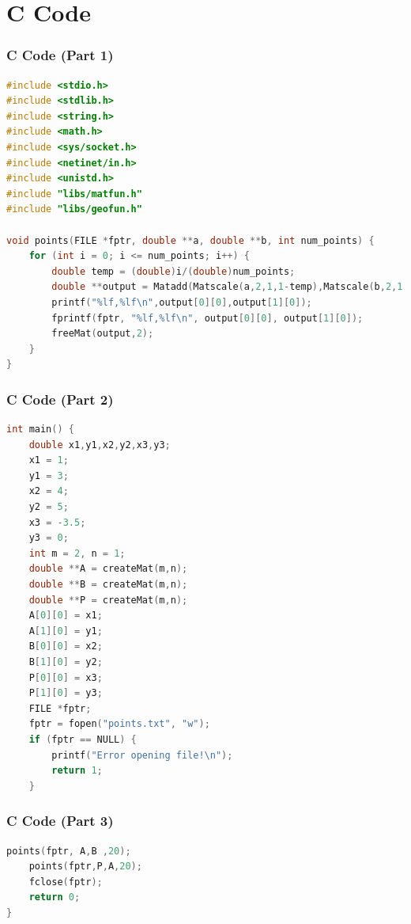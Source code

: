 \documentclass{beamer}
\theoremstyle{remark}
\begin{document}
\section{C Code}
\begin{frame}[fragile]
\frametitle{C Code (Part 1)}
\vspace{0.3cm} %
\begin{lstlisting}[language=C]
#include <stdio.h>
#include <stdlib.h>
#include <string.h>
#include <math.h>
#include <sys/socket.h>
#include <netinet/in.h>
#include <unistd.h>
#include "libs/matfun.h"
#include "libs/geofun.h"

void points(FILE *fptr, double **a, double **b, int num_points) {
    for (int i = 0; i <= num_points; i++) {
        double temp = (double)i/(double)num_points;
        double **output = Matadd(Matscale(a,2,1,1-temp),Matscale(b,2,1,temp),2,1);
        printf("%lf,%lf\n",output[0][0],output[1][0]);
        fprintf(fptr, "%lf,%lf\n", output[0][0], output[1][0]);
        freeMat(output,2);
    }
}
\end{lstlisting}
\vspace{0.3cm} %
\end{frame}

\begin{frame}[fragile]
\frametitle{C Code (Part 2)}
\vspace{0.3cm} %
\begin{lstlisting}[language=C]
int main() {
    double x1,y1,x2,y2,x3,y3;
    x1 = 1; 
    y1 = 3;
    x2 = 4; 
    y2 = 5;
    x3 = -3.5;
    y3 = 0;
    int m = 2, n = 1;
    double **A = createMat(m,n);
    double **B = createMat(m,n);
    double **P = createMat(m,n);
    A[0][0] = x1;
    A[1][0] = y1;
    B[0][0] = x2;
    B[1][0] = y2;
    P[0][0] = x3;
    P[1][0] = y3;
    FILE *fptr;
    fptr = fopen("points.txt", "w");
    if (fptr == NULL) {
        printf("Error opening file!\n");
        return 1;
    }
\end{lstlisting}
\vspace{0.3cm} %
\end{frame}

\begin{frame}[fragile]
\frametitle{C Code (Part 3)}
\vspace{0.3cm} %
\begin{lstlisting}[language=C]
    points(fptr, A,B ,20);
    points(fptr,P,A,20);
    fclose(fptr);
    return 0;
}
\end{lstlisting}
\vspace{0.3cm} %
\end{frame}
\end{document}
